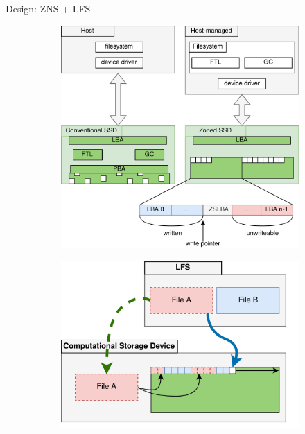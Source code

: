 \documentclass{beamer}
\begin{document}


\begin{frame}{Design: ZNS + LFS}
	\begingroup
	\small
	\begin{figure}[h]
		\centering
		\begin{subfigure}{0.5\textwidth}
			  \centering
			  \includegraphics[width=0.9\linewidth]{resources/images/zns-vs-conventional-expanded.png}
		\end{subfigure}%
		\begin{subfigure}{0.5\textwidth}
			  \centering
			  \includegraphics[width=0.9\linewidth]{resources/images/lfs.png}
		\end{subfigure}
	\end{figure}
	\endgroup
\end{frame}
\end{document}
